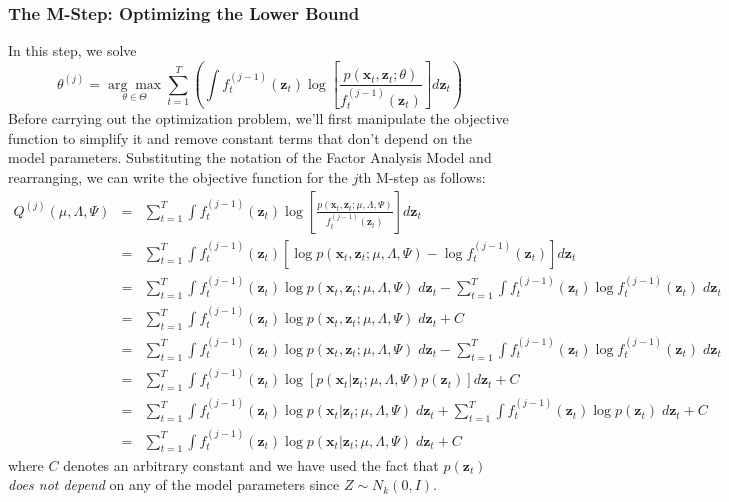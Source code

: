 \subsubsection{The M-Step: Optimizing the Lower Bound}
In this step, we solve 
	$$\displaystyle\theta^{(j)} = \underset{\theta \in \Theta}{\arg \max} \sum_{t = 1}^T  \left(\int f_t^{(j-1)}(\mathbf{z}_t) \log\left[\frac{p(\textbf{x}_t,\textbf{z}_t;\theta)}{f_t^{(j-1)}(\mathbf{z}_t)}\right] d \textbf{z}_t \right)$$
Before carrying out the optimization problem, we'll first manipulate the objective function to simplify it and remove constant terms that don't depend on the model parameters. Substituting the notation of the Factor Analysis Model and rearranging, we can write the objective function for the $j$th M-step as follows:
	\begin{eqnarray*}
		Q^{(j)}(\mu, \Lambda, \Psi) &=& \sum_{t=1}^T \int f_t^{(j-1)}(\textbf{z}_t) \log \left[ \frac{p(\textbf{x}_t, \textbf{z}_t;\mu, \Lambda, \Psi)}{f_t^{(j-1)}(\textbf{z}_t)}\right] d \textbf{z}_t\\
			&=&	\sum_{t=1}^T \int f_t^{(j-1)}(\textbf{z}_t) \left[\log p(\textbf{x}_t, \textbf{z}_t;\mu, \Lambda, \Psi) - \log f_t^{(j-1)}(\textbf{z}_t)\right] d \textbf{z}_t\\
		&=&\sum_{t=1}^T \int f_t^{(j-1)}(\textbf{z}_t) \log p(\textbf{x}_t, \textbf{z}_t;\mu, \Lambda, \Psi)\;d \textbf{z}_t -\sum_{t=1}^T  \int f_t^{(j-1)}(\textbf{z}_t) \log f_t^{(j-1)}(\textbf{z}_t) \;d \textbf{z}_t\\
		&=&\sum_{t=1}^T \int f_t^{(j-1)}(\textbf{z}_t) \log p(\textbf{x}_t, \textbf{z}_t;\mu, \Lambda, \Psi)\;d \textbf{z}_t  + C\\
		&=& \sum_{t=1}^T \int f_t^{(j-1)}(\textbf{z}_t) \log p(\textbf{x}_t, \textbf{z}_t;\mu, \Lambda, \Psi)\;d \textbf{z}_t -\sum_{t=1}^T  \int f_t^{(j-1)}(\textbf{z}_t) \log f_t^{(j-1)}(\textbf{z}_t) \;d \textbf{z}_t\\
		&=&\sum_{t=1}^T \int f_t^{(j-1)}(\textbf{z}_t) \log\left[ p(\textbf{x}_t| \textbf{z}_t;\mu, \Lambda, \Psi)p(\textbf{z}_t) \right]d \textbf{z}_t  + C\\
		&=&\sum_{t=1}^T \int f_t^{(j-1)}(\textbf{z}_t) \log p(\textbf{x}_t| \textbf{z}_t;\mu, \Lambda, \Psi)\;d \textbf{z}_t + \sum_{t=1}^T \int f_t^{(j-1)}(\textbf{z}_t)\log p(\textbf{z}_t)\; d \mathbf{z}_t + C\\
		&=& \sum_{t=1}^T \int f_t^{(j-1)}(\textbf{z}_t) \log p(\textbf{x}_t| \textbf{z}_t;\mu, \Lambda, \Psi)\;d \textbf{z}_t + C
	\end{eqnarray*} 
where $C$ denotes an arbitrary constant and we have used the fact that $p(\mathbf{z}_t)$ \emph{does not depend} on any of the model parameters since $Z \sim N_k(0, I)$. 

